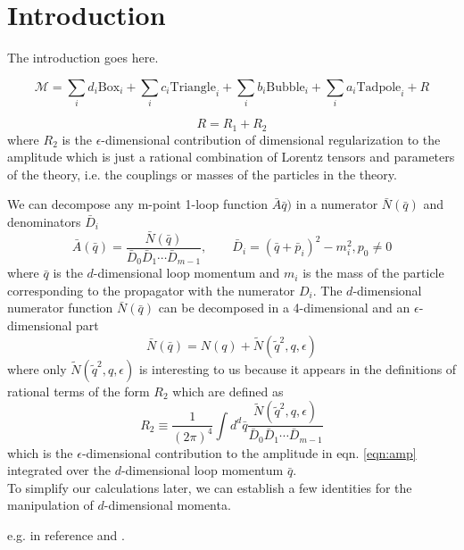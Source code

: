 \section{Introduction}
\label{sec:Introduction} 

The introduction goes here.

\begin{equation}
\mathcal{M} = \sum_i d_i \mathrm{Box}_i + \sum_i c_i \mathrm{Triangle}_i + \sum_i b_i \mathrm{Bubble}_i + \sum_i a_i \mathrm{Tadpole}_i + R
\end{equation}

\begin{equation}
R = R_1 + R_2
\end{equation}
where $R_2$ is the $\epsilon$-dimensional contribution of dimensional regularization to the amplitude which is just a rational combination of Lorentz tensors and parameters of the theory, i.e. the couplings or masses of the particles in the theory.


We can decompose any m-point 1-loop function $\bar{A}\bar{q})$ in a numerator $\bar{N}( \bar{q})$ and denominators $\bar{D}_i$
\begin{equation}
\label{eqn:amp}
\bar{A} (\bar{q}) = \frac{\bar{N}(\bar{q})}{\bar{D}_0\bar{D}_1\cdots\bar{D}_{m-1}}, \qquad \bar{D}_i = \left( \bar{q} + \bar{p}_i \right)^2 - m_i^2, p_0 \neq 0
\end{equation}
where $\bar{q}$ is the $d$-dimensional loop momentum and $m_i$ is the mass of the particle corresponding to the propagator with the numerator $D_i$. The $d$-dimensional numerator function $\bar{N}(\bar{q})$ can be decomposed in a 4-dimensional and an $\epsilon$-dimensional part 
\begin{equation}
\bar{N}( \bar{q}) = N (q) + \tilde{N} (\tilde{q}^2,q,\epsilon)
\end{equation}
where only $\tilde{N} (\tilde{q}^2,q,\epsilon)$ is interesting to us because it appears in the definitions of rational terms of the form $R_2$ which are defined as
\begin{equation}
R_2 \equiv \frac{1}{\left( 2\pi \right)^4} \int d^d \bar{q} \frac{\tilde{N} ( \tilde{q}^2,q,\epsilon)}{\bar{D}_0\bar{D}_1\cdots\bar{D}_{m-1}}
\end{equation}
which is the $\epsilon$-dimensional contribution to the amplitude in eqn. \ref{eqn:amp} integrated over the $d$-dimensional loop momentum $\bar{q}$. \\
To simplify our calculations later, we can establish a few identities for the manipulation of $d$-dimensional momenta.

e.g. in reference \cite{R2QCD} and \cite{R2QED}.



